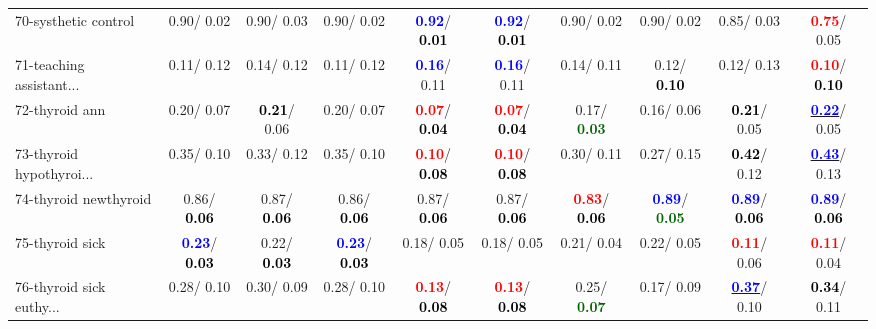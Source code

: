 \begin{table}[h]
\begin{center}
{\begin{tabular}{lc|c|c|c|c|c|c|c|c}
70-systhetic control &   0.90/  0.02 &   0.90/  0.03 &   0.90/  0.02 & \textcolor{blue}{\textbf{  0.92}}/\textcolor{black}{\textbf{  0.01}} & \textcolor{blue}{\textbf{  0.92}}/\textcolor{black}{\textbf{  0.01}} &   0.90/  0.02 &   0.90/  0.02 &   0.85/  0.03 & \textcolor{red}{\textbf{  0.75}}/  0.05 \\
71-teaching assistant... &   0.11/  0.12 &   0.14/  0.12 &   0.11/  0.12 & \textcolor{blue}{\textbf{  0.16}}/  0.11 & \textcolor{blue}{\textbf{  0.16}}/  0.11 &   0.14/  0.11 &   0.12/\textcolor{black}{\textbf{  0.10}} &   0.12/  0.13 & \textcolor{red}{\textbf{  0.10}}/\textcolor{black}{\textbf{  0.10}} \\ \hline
72-thyroid ann &   0.20/  0.07 & \textcolor{black}{\textbf{  0.21}}/  0.06 &   0.20/  0.07 & \textcolor{red}{\textbf{  0.07}}/\textcolor{black}{\textbf{  0.04}} & \textcolor{red}{\textbf{  0.07}}/\textcolor{black}{\textbf{  0.04}} &   0.17/\textcolor{darkgreen}{\textbf{  0.03}} &   0.16/  0.06 & \textcolor{black}{\textbf{  0.21}}/  0.05 & \underline{\textcolor{blue}{\textbf{  0.22}}}/  0.05 \\
73-thyroid hypothyroi... &   0.35/  0.10 &   0.33/  0.12 &   0.35/  0.10 & \textcolor{red}{\textbf{  0.10}}/\textcolor{black}{\textbf{  0.08}} & \textcolor{red}{\textbf{  0.10}}/\textcolor{black}{\textbf{  0.08}} &   0.30/  0.11 &   0.27/  0.15 & \textcolor{black}{\textbf{  0.42}}/  0.12 & \underline{\textcolor{blue}{\textbf{  0.43}}}/  0.13 \\
74-thyroid newthyroid &   0.86/\textcolor{black}{\textbf{  0.06}} &   0.87/\textcolor{black}{\textbf{  0.06}} &   0.86/\textcolor{black}{\textbf{  0.06}} &   0.87/\textcolor{black}{\textbf{  0.06}} &   0.87/\textcolor{black}{\textbf{  0.06}} & \textcolor{red}{\textbf{  0.83}}/\textcolor{black}{\textbf{  0.06}} & \textcolor{blue}{\textbf{  0.89}}/\textcolor{darkgreen}{\textbf{  0.05}} & \textcolor{blue}{\textbf{  0.89}}/\textcolor{black}{\textbf{  0.06}} & \textcolor{blue}{\textbf{  0.89}}/\textcolor{black}{\textbf{  0.06}} \\
75-thyroid sick & \textcolor{blue}{\textbf{  0.23}}/\textcolor{black}{\textbf{  0.03}} &   0.22/\textcolor{black}{\textbf{  0.03}} & \textcolor{blue}{\textbf{  0.23}}/\textcolor{black}{\textbf{  0.03}} &   0.18/  0.05 &   0.18/  0.05 &   0.21/  0.04 &   0.22/  0.05 & \textcolor{red}{\textbf{  0.11}}/  0.06 & \textcolor{red}{\textbf{  0.11}}/  0.04 \\
76-thyroid sick euthy... &   0.28/  0.10 &   0.30/  0.09 &   0.28/  0.10 & \textcolor{red}{\textbf{  0.13}}/\textcolor{black}{\textbf{  0.08}} & \textcolor{red}{\textbf{  0.13}}/\textcolor{black}{\textbf{  0.08}} &   0.25/\textcolor{darkgreen}{\textbf{  0.07}} &   0.17/  0.09 & \underline{\textcolor{blue}{\textbf{  0.37}}}/  0.10 & \textcolor{black}{\textbf{  0.34}}/  0.11 \\

\end{tabular}}
\end{center}
\end{table}
